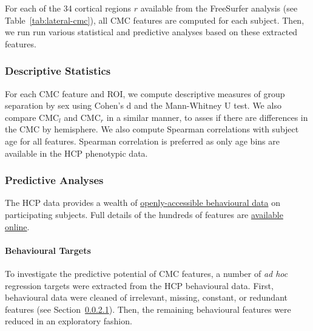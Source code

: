 \documentclass{article}
\begin{document}
For each of the 34 cortical regions \(r\) available from the FreeSurfer
analysis (see Table~\ref{tab:lateral-cmc}), all CMC features are
computed for each subject. Then, we run run various statistical and
predictive analyses based on these extracted features.

\subsubsection{Descriptive Statistics}


For each CMC feature and ROI, we compute descriptive measures of group
separation by sex using Cohen's d and the Mann-Whitney U test. We also
compare \(\text{CMC}_l\) and \(\text{CMC}_r\) in a similar manner, to asses
if there are differences in the \(\text{CMC}\) by hemisphere. We also compute
Spearman correlations with subject age for all features. Spearman correlation
is preferred as only age bins are available in the HCP phenotypic data.


%




\subsubsection{Predictive Analyses}

The HCP data provides a wealth of
\href{https://www.humanconnectome.org/study/hcp-young-adult/document/wu-minn-hcp-consortium-open-access-data-use-terms}{openly-accessible
behavioural data} on participating subjects. Full details of the hundreds of
features are
\href{https://wiki.humanconnectome.org/docs/HCP-YA%20Data%20Dictionary-%20Updated%20for%20the%201200%20Subject%20Release.html}{available
online}.

\paragraph{Behavioural Targets} \label{sec:cleaning}

To investigate the predictive potential of CMC features, a number of \emph{ad
hoc} regression targets were extracted from the HCP behavioural data.
First, behavioural data were cleaned of irrelevant, missing, constant, or
redundant features (see Section~\ref{sec:cleaning}). Then, the remaining
behavioural features were reduced in an exploratory fashion.
\end{document}
